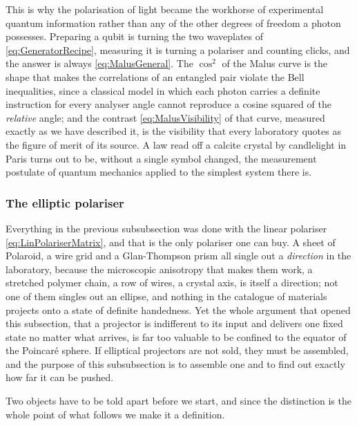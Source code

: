             This is why the polarisation of light became the workhorse of experimental quantum information rather than any of the other degrees of freedom a photon possesses. Preparing a qubit is turning the two waveplates of \ref{eq:GeneratorRecipe}, measuring it is turning a polariser and counting clicks, and the answer is always \ref{eq:MalusGeneral}. The $\cos^2$ of the Malus curve is the shape that makes the correlations of an entangled pair violate the Bell inequalities, since a classical model in which each photon carries a definite instruction for every analyser angle cannot reproduce a cosine squared of the \textit{relative} angle; and the contrast \ref{eq:MalusVisibility} of that curve, measured exactly as we have described it, is the visibility that every laboratory quotes as the figure of merit of its source. A law read off a calcite crystal by candlelight in Paris turns out to be, without a single symbol changed, the measurement postulate of quantum mechanics applied to the simplest system there is.

        \subsubsection{The elliptic polariser}

            Everything in the previous subsubsection was done with the linear polariser \ref{eq:LinPolariserMatrix}, and that is the only polariser one can buy. A sheet of Polaroid, a wire grid and a Glan-Thompson prism all single out a \textit{direction} in the laboratory, because the microscopic anisotropy that makes them work, a stretched polymer chain, a row of wires, a crystal axis, is itself a direction; not one of them singles out an ellipse, and nothing in the catalogue of materials projects onto a state of definite handedness. Yet the whole argument that opened this subsection, that a projector is indifferent to its input and delivers one fixed state no matter what arrives, is far too valuable to be confined to the equator of the Poincaré sphere. If elliptical projectors are not sold, they must be assembled, and the purpose of this subsubsection is to assemble one and to find out exactly how far it can be pushed.

            Two objects have to be told apart before we start, and since the distinction is the whole point of what follows we make it a definition.

